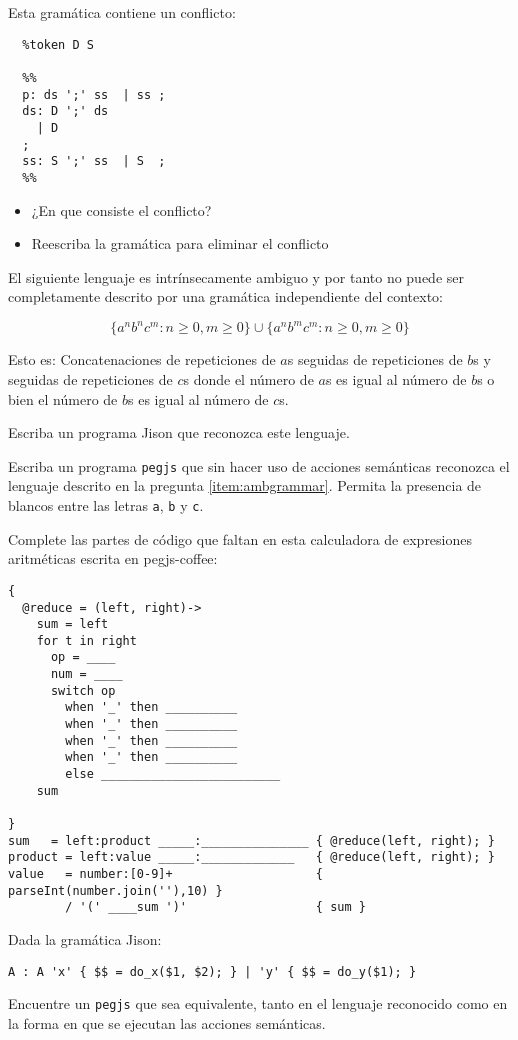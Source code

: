 
\item
Esta gramática contiene un conflicto:

\begin{verbatim}
  %token D S

  %%
  p: ds ';' ss  | ss ;
  ds: D ';' ds    
    | D  
  ;
  ss: S ';' ss  | S  ;
  %% 
\end{verbatim}

\begin{itemize}
\item ¿En que consiste el conflicto?
\item
Reescriba la gramática para eliminar el conflicto
\end{itemize}


\item
\label{item:ambgrammar}
El siguiente lenguaje es intrínsecamente ambiguo y por tanto no puede ser completamente 
descrito por una gramática independiente del contexto:


 \[ \{ a^n b^n c^m : n \ge 0, m \ge 0 \} \cup \{ a^n b^m c^m : n \ge 0, m \ge 0 \} \]

Esto  es: Concatenaciones de repeticiones 
de $a$s seguidas de repeticiones de $b$s y seguidas de
repeticiones de $c$s donde el número
de $a$s es igual al número de $b$s
o bien el número de $b$s es igual al número de $c$s.

Escriba un programa Jison que reconozca este lenguaje.

\item 
Escriba un programa \verb|pegjs| que sin hacer uso de acciones semánticas
reconozca el lenguaje 
descrito en la pregunta
\ref{item:ambgrammar}.
Permita la presencia de blancos entre las letras \verb|a|, \verb|b| y \verb|c|.

\item 
Complete las partes de código que faltan 
en esta calculadora de expresiones aritméticas
escrita en pegjs-coffee:

\begin{verbatim}
{ 
  @reduce = (left, right)->  
    sum = left
    for t in right
      op = ____
      num = ____
      switch op 
        when '_' then __________
        when '_' then __________
        when '_' then __________
        when '_' then __________
        else _________________________
    sum
  
}
sum   = left:product _____:_______________ { @reduce(left, right); }
product = left:value _____:_____________   { @reduce(left, right); }
value   = number:[0-9]+                    { parseInt(number.join(''),10) }
        / '(' ____sum ')'                  { sum }
\end{verbatim}
\item 
Dada la gramática Jison:
\begin{verbatim}
A : A 'x' { $$ = do_x($1, $2); } | 'y' { $$ = do_y($1); }
\end{verbatim}
Encuentre un \verb|pegjs| que sea equivalente, tanto en el lenguaje reconocido como en 
la forma en que se ejecutan las acciones semánticas.


